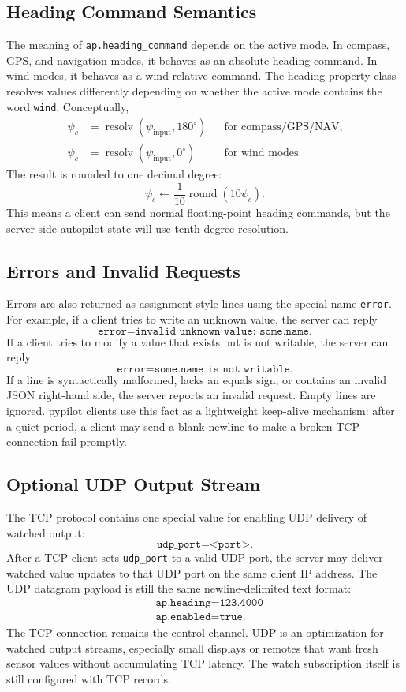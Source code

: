 \documentclass[10pt,twocolumn]{article}
\begin{document}
\subsection{Heading Command Semantics}
The meaning of \texttt{ap.heading\_command} depends on the active mode.
In compass, GPS, and navigation modes, it behaves as an absolute heading
command.  In wind modes, it behaves as a wind-relative command.  The
heading property class resolves values differently depending on whether
the active mode contains the word \texttt{wind}.  Conceptually,
\[
\begin{aligned}
\psi_c &=
\operatorname{resolv}(\psi_{\mathrm{input}},180^\circ)
&& \text{for compass/GPS/NAV},\\
\psi_c &=
\operatorname{resolv}(\psi_{\mathrm{input}},0^\circ)
&& \text{for wind modes}.
\end{aligned}
\]
The result is rounded to one decimal degree:
\[
\psi_c \leftarrow \frac{1}{10}
\operatorname{round}(10\psi_c).
\]
This means a client can send normal floating-point heading commands, but
the server-side autopilot state will use tenth-degree resolution.
\subsection{Errors and Invalid Requests}
Errors are also returned as assignment-style lines using the special name
\texttt{error}.  For example, if a client tries to write an unknown value,
the server can reply
\[
\texttt{error=invalid unknown value: some.name}.
\]
If a client tries to modify a value that exists but is not writable, the
server can reply
\[
\texttt{error=some.name is not writable}.
\]
If a line is syntactically malformed, lacks an equals sign, or contains an
invalid JSON right-hand side, the server reports an invalid request.  Empty
lines are ignored.  pypilot clients use this fact as a lightweight
keep-alive mechanism: after a quiet period, a client may send a blank
newline to make a broken TCP connection fail promptly.
\subsection{Optional UDP Output Stream}
The TCP protocol contains one special value for enabling UDP delivery of
watched output:
\[
\texttt{udp\_port=<port>}.
\]
After a TCP client sets \texttt{udp\_port} to a valid UDP port, the server
may deliver watched value updates to that UDP port on the same client IP
address.  The UDP datagram payload is still the same newline-delimited
text format:
\[
\begin{aligned}
&\texttt{ap.heading=123.4000}\\
&\texttt{ap.enabled=true}.
\end{aligned}
\]
The TCP connection remains the control channel.  UDP is an optimization
for watched output streams, especially small displays or remotes that want
fresh sensor values without accumulating TCP latency.  The watch
subscription itself is still configured with TCP records.
\end{document}
